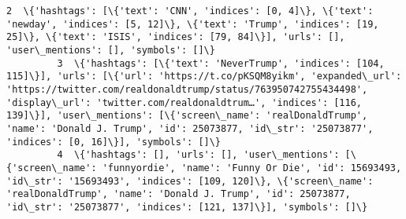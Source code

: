 \documentclass[11pt]{article}
\begin{document}
\begin{Verbatim}[commandchars=\\\{\}]
         2  \{'hashtags': [\{'text': 'CNN', 'indices': [0, 4]\}, \{'text': 'newday', 'indices': [5, 12]\}, \{'text': 'Trump', 'indices': [19, 25]\}, \{'text': 'ISIS', 'indices': [79, 84]\}], 'urls': [], 'user\_mentions': [], 'symbols': []\}                                                                                                                                                                                                                                                                                                                                                                                                                                                                                                                                                                                                                                                                
         3  \{'hashtags': [\{'text': 'NeverTrump', 'indices': [104, 115]\}], 'urls': [\{'url': 'https://t.co/pKSQM8yikm', 'expanded\_url': 'https://twitter.com/realdonaldtrump/status/763950742755434498', 'display\_url': 'twitter.com/realdonaldtrum…', 'indices': [116, 139]\}], 'user\_mentions': [\{'screen\_name': 'realDonaldTrump', 'name': 'Donald J. Trump', 'id': 25073877, 'id\_str': '25073877', 'indices': [0, 16]\}], 'symbols': []\}                                                                                                                                                                                                                                                                                                                                                                                                                                                             
         4  \{'hashtags': [], 'urls': [], 'user\_mentions': [\{'screen\_name': 'funnyordie', 'name': 'Funny Or Die', 'id': 15693493, 'id\_str': '15693493', 'indices': [109, 120]\}, \{'screen\_name': 'realDonaldTrump', 'name': 'Donald J. Trump', 'id': 25073877, 'id\_str': '25073877', 'indices': [121, 137]\}], 'symbols': []\}                                                                                                                                                                                                                                                                                                                                                                                                                                                                                                                                                                           
         

\end{Verbatim}
\end{document}
